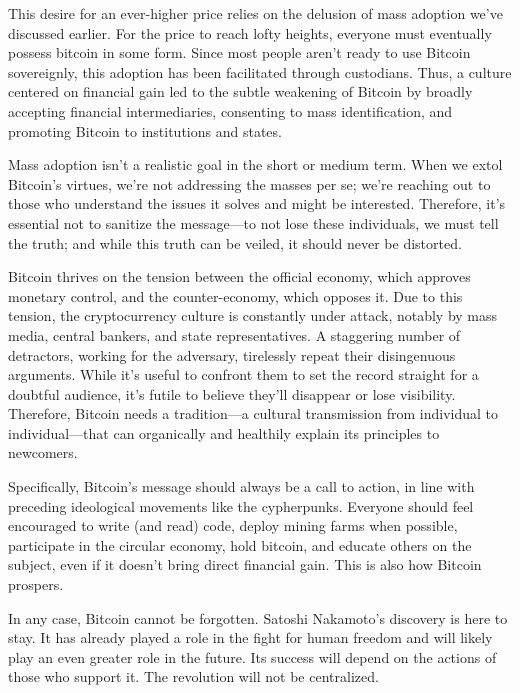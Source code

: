 \documentclass[
  a5paper,
  smalldemyvopaper,10pt,twoside,onecolumn,openright,extrafontsizes,hidelinks]{memoir}
\begin{document}
This desire for an ever-higher price relies on the delusion of mass
adoption we've discussed earlier. For the price to reach lofty heights,
everyone must eventually possess bitcoin in some form. Since most people
aren't ready to use Bitcoin sovereignly, this adoption has been
facilitated through custodians. Thus, a culture centered on financial
gain led to the subtle weakening of Bitcoin by broadly accepting
financial intermediaries, consenting to mass identification, and
promoting Bitcoin to institutions and states.

Mass adoption isn't a realistic goal in the short or medium term. When
we extol Bitcoin's virtues, we're not addressing the masses per se;
we're reaching out to those who understand the issues it solves and
might be interested. Therefore, it's essential not to sanitize the
message---to not lose these individuals, we must tell the truth; and
while this truth can be veiled, it should never be distorted.

Bitcoin thrives on the tension between the official economy, which
approves monetary control, and the counter-economy, which opposes it.
Due to this tension, the cryptocurrency culture is constantly under
attack, notably by mass media, central bankers, and state
representatives. A staggering number of detractors, working for the
adversary, tirelessly repeat their disingenuous arguments. While it's
useful to confront them to set the record straight for a doubtful
audience, it's futile to believe they'll disappear or lose visibility.
Therefore, Bitcoin needs a tradition---a cultural transmission from
individual to individual---that can organically and healthily explain
its principles to newcomers.

Specifically, Bitcoin's message should always be a call to action, in
line with preceding ideological movements like the cypherpunks. Everyone
should feel encouraged to write (and read) code, deploy mining farms
when possible, participate in the circular economy, hold bitcoin, and
educate others on the subject, even if it doesn't bring direct financial
gain. This is also how Bitcoin prospers.

In any case, Bitcoin cannot be forgotten. Satoshi Nakamoto's discovery
is here to stay. It has already played a role in the fight for human
freedom and will likely play an even greater role in the future. Its
success will depend on the actions of those who support it. The
revolution will not be centralized.


\backmatter
\end{document}
